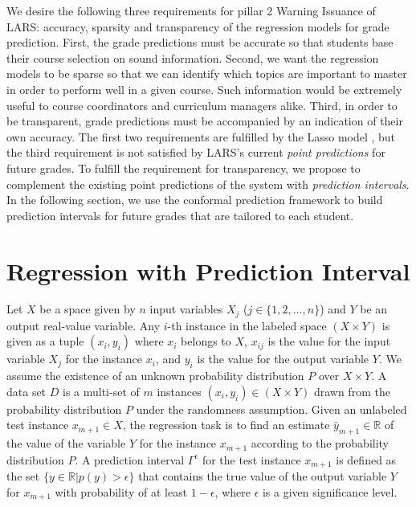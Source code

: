 \documentclass[pmlr]{jmlr}%
\begin{document}
We desire the following three requirements for pillar 2 Warning Issuance of LARS: accuracy, sparsity and transparency of the regression models for grade prediction. First, the grade predictions must be accurate so that students base their course selection on sound information. Second, we want the regression models to be sparse so that we can identify which topics are important to master in order to perform well in a given course. Such information would be extremely useful to course coordinators and curriculum managers alike. Third, in order to be transparent, grade predictions must be accompanied by an indication of their own accuracy. The first two requirements are fulfilled by the Lasso model \citep{Tibshirani.1996}, but the third requirement is not satisfied by LARS's current \textit{point predictions} for future grades. To fulfill the requirement for transparency, we propose to complement the existing point predictions of the system with \textit{prediction intervals}. In the following section, we use the conformal prediction framework to build prediction intervals for future grades that are tailored to each student.

\section{Regression with Prediction Interval}
\label{sec:prediction}

Let $X$ be a space given by $n$ input variables $X_j$ ($j \in \{1, 2, \ldots, n\}$) and $Y$ be an output real-value variable. Any $i$-th instance in the labeled space  $(X \times Y)$ is given as a tuple $(x_i, y_i)$ where $x_i$ belongs to $X$, $x_{ij}$ is the value for the input variable $X_j$ for the instance $x_i$, and $y_i$ is the value for the output variable $Y$. We assume the existence of an unknown  probability distribution $P$ over $X \times Y$.  A data set $D$ is a multi-set of $m$ instances $(x_i, y_{i}) \in (X \times Y)$ drawn from the probability distribution $P$ under the randomness assumption.  Given an unlabeled test  instance $x_{m+1} \in X$,  the regression  task  is to find an estimate $\hat{y}_{m+1} \in \mathbb{R}$ of the value of the variable $Y$ for the instance $x_{m+1}$ according to the probability distribution $P$. A  prediction interval $\Gamma^\epsilon$ for the test instance $x_{m+1}$ is defined as the set $\{ y \in \mathbb{R}| p(y) > \epsilon\}$ that contains the true value of the output variable $Y$ for $x_{m+1}$ with probability of at least $1- \epsilon$, where $\epsilon$ is a given significance level.
\end{document}
